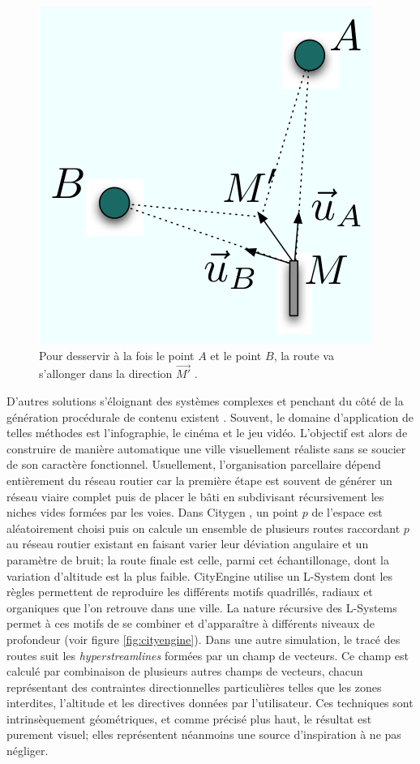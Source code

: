 \documentclass[10pt]{article}
\begin{document}
\begin{figure}[H]
  \centering
  \includegraphics[width=.4\linewidth]{images/barthelemy-road.png}
  \caption{Pour desservir à la fois le point $A$ et le point $B$, la
    route va s'allonger dans la direction $\vec{M'}$
    \cite{Barthelemy2008,Barthelemy2009}.}
  \label{fig:barthelemy}
\end{figure}

D'autres solutions s'éloignant des systèmes complexes et penchant du
côté de la génération procédurale de contenu existent
\cite{Kelly2006}. Souvent, le domaine d'application de telles méthodes
est l'infographie, le cinéma et le jeu vidéo. L'objectif est alors de
construire de manière automatique une ville visuellement réaliste sans
se soucier de son caractère fonctionnel. Usuellement, l'organisation
parcellaire dépend entièrement du réseau routier car la première étape
est souvent de générer un réseau viaire complet puis de placer le bâti
en subdivisant récursivement les niches vides formées par les
voies. Dans Citygen \cite{Kelly2006b}, un point $p$ de l'espace est
aléatoirement choisi puis on calcule un ensemble de plusieurs routes
raccordant $p$ au réseau routier existant en faisant varier leur
déviation angulaire et un paramètre de bruit; la route finale est
celle, parmi cet échantillonage, dont la variation d'altitude est la
plus faible. CityEngine \cite{Parish2001} utilise un L-System dont les
règles permettent de reproduire les différents motifs quadrillés,
radiaux et organiques que l'on retrouve dans une ville. La nature
récursive des L-Systems permet à ces motifs de se combiner et
d'apparaître à différents niveaux de profondeur (voir figure
\ref{fig:cityengine}). Dans une autre simulation, le tracé des routes
suit les \textit{hyperstreamlines} \cite{Chen2008} formées par un
champ de vecteurs. Ce champ est calculé par combinaison de plusieurs
autres champs de vecteurs, chacun représentant des contraintes
directionnelles particulières telles que les zones interdites,
l'altitude et les directives données par l'utilisateur. Ces techniques
sont intrinsèquement géométriques, et comme précisé plus haut, le
résultat est purement visuel; elles représentent néanmoins une source
d'inspiration à ne pas négliger.
\end{document}
